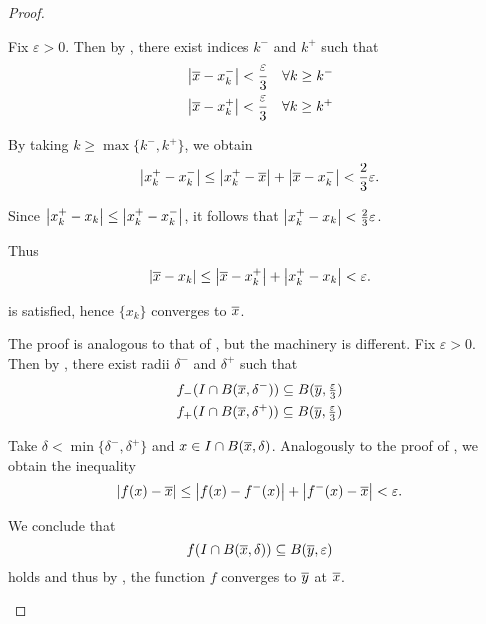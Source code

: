 \begin{proof}\mbox{}
  \begin{description}
     Fix \( \varepsilon > 0 \). Then by , there exist indices \( k^- \) and \( k^+ \) such that
    \begin{align*}
      &\left\vert \overline{x} - x_k^- \right\vert < \frac \varepsilon 3 \quad\forall k \geq k^- \\
      &\left\vert \overline{x} - x_k^+ \right\vert < \frac \varepsilon 3 \quad\forall k \geq k^+
    \end{align*}

    By taking \( k \geq \max \{ k^-, k^+ \} \), we obtain
    \begin{equation*}
      \left\vert x_k^+ - x_k^- \right\vert \leq \left\vert x_k^+ - \overline{x} \right\vert + \left\vert \overline{x} - x_k^- \right\vert < \frac 2 3 \varepsilon.
    \end{equation*}

    Since \( \left\vert x_k^+ - x_k \right\vert \leq \left\vert x_k^+ - x_k^- \right\vert \), it follows that \( \left\vert x_k^+ - x_k \right\vert < \frac 2 3 \varepsilon \).

    Thus
    \begin{equation*}
      \left\vert \overline{x} - x_k \right\vert \leq \left\vert \overline{x} - x_k^+ \right\vert + \left\vert x_k^+ - x_k \right\vert < \varepsilon.
    \end{equation*}

     is satisfied, hence \( \{ x_k \} \) converges to \( \overline{x} \).

     The proof is analogous to that of , but the machinery is different. Fix \( \varepsilon > 0 \). Then by , there exist radii \( \delta^- \) and \( \delta^+ \) such that
    \begin{align*}
      &f_-(I \cap B(\overline{x}, \delta^-)) \subseteq B(\overline{y}, \tfrac \varepsilon 3) \\
      &f_+(I \cap B(\overline{x}, \delta^+)) \subseteq B(\overline{y}, \tfrac \varepsilon 3)
    \end{align*}

    Take \( \delta < \min \{ \delta^-, \delta^+ \} \) and \( x \in I \cap B(\overline{x}, \delta) \). Analogously to the proof of , we obtain the inequality
    \begin{equation*}
      \left\vert f(x) - \overline{x} \right\vert \leq \left\vert f(x) - f^-(x) \right\vert + \left\vert f^-(x) - \overline{x} \right\vert < \varepsilon.
    \end{equation*}

    We conclude that
    \begin{equation*}
      f(I \cap B(\overline{x}, \delta)) \subseteq B(\overline{y}, \varepsilon)
    \end{equation*}
    holds and thus by , the function \( f \) converges to \( \overline{y} \) at \( \overline{x} \).
  \end{description}
\end{proof}

